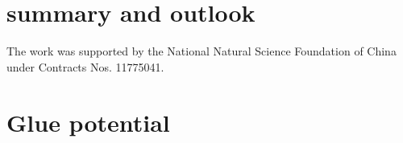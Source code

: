 \documentclass[%
reprint,
superscriptaddress,
showpacs,preprintnumbers,
 amsmath,amssymb,
 aps,
prd,
]{revtex4-1}
\begin{document}

\section{summary and outlook}
\label{sec:SO}


\begin{acknowledgments}

The work was supported by the National Natural Science Foundation of China under Contracts Nos. 11775041.

\end{acknowledgments}


\appendix

\section{Glue potential}
\label{app:gluepot}
\end{document}
